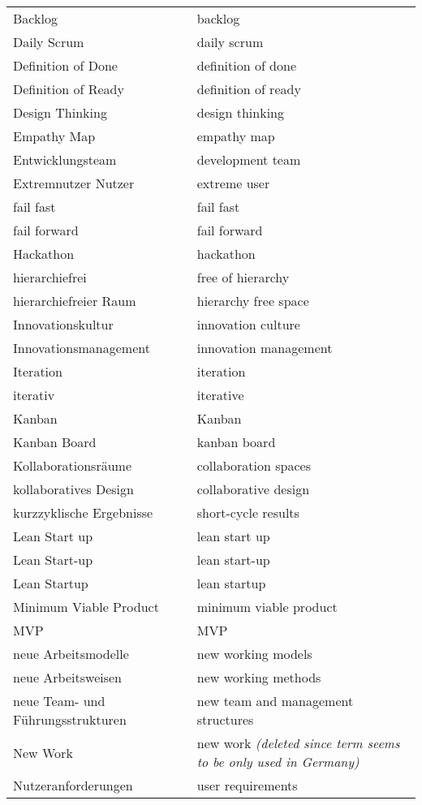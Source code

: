 \begin{spacing}{.5}
\begin{longtable}{ p{} p{}}
    Backlog & backlog \\
    Daily Scrum & daily scrum \\
    Definition of Done & definition of done \\
    Definition of Ready & definition of ready \\
    Design Thinking & design thinking \\
    Empathy Map & empathy map \\
    Entwicklungsteam & development team \\
    Extremnutzer Nutzer & extreme user \\
    fail fast & fail fast \\
    fail forward & fail forward \\
    Hackathon & hackathon \\
    hierarchiefrei & free of hierarchy \\
    hierarchiefreier Raum & hierarchy free space \\
    Innovationskultur & innovation culture \\
    Innovationsmanagement & innovation management \\
    Iteration & iteration \\
    iterativ & iterative \\
    Kanban & Kanban \\
    Kanban Board & kanban board \\
    Kollaborationsräume & collaboration spaces \\
    kollaboratives Design & collaborative design \\
    kurzzyklische Ergebnisse & short-cycle results \\
    Lean Start up & lean start up \\
    Lean Start-up & lean start-up \\
    Lean Startup & lean startup \\
    Minimum Viable Product & minimum viable product \\
    MVP & MVP \\
    neue Arbeitsmodelle & new working models \\
    neue Arbeitsweisen & new working methods \\
    neue Team- und Führungsstrukturen & new team and management structures \\
    New Work & new work \textit{(deleted since term seems to be only used in Germany)}\\
    Nutzeranforderungen & user requirements \\

\end{longtable}
\end{spacing}

